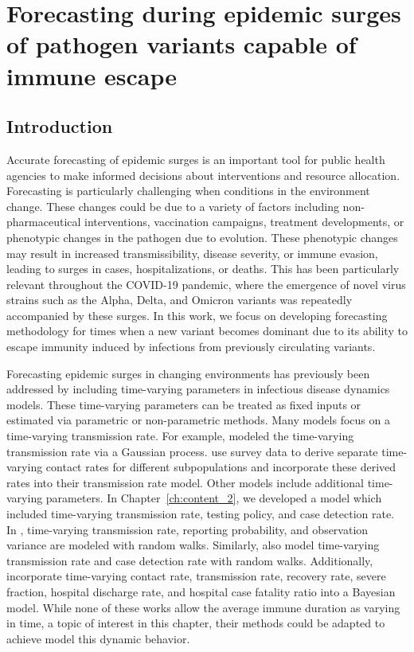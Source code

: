 \chapter{Forecasting during epidemic surges of pathogen variants capable of immune escape}
\graphicspath{{figures/ch_5/}}
\label{ch:content_3}

\section{Introduction}
\label{ch_5:sec:intro}

Accurate forecasting of epidemic surges is an important tool for public health agencies to make informed decisions about interventions and resource allocation.
Forecasting is particularly challenging when conditions in the environment change.
These changes could be due to a variety of factors including non-pharmaceutical interventions, vaccination campaigns, treatment developments, or phenotypic changes in the pathogen due to evolution.
These phenotypic changes may result in increased transmissibility, disease severity, or immune evasion, leading to surges in cases, hospitalizations, or deaths.
This has been particularly relevant throughout the COVID-19 pandemic, where the emergence of novel virus strains such as the Alpha, Delta, and Omicron variants was repeatedly accompanied by these surges.
In this work, we focus on developing forecasting methodology for times when a new variant becomes dominant due to its ability to escape immunity induced by infections from previously circulating variants.

Forecasting epidemic surges in changing environments has previously been addressed by including time-varying parameters in infectious disease dynamics models.
These time-varying parameters can be treated as fixed inputs or estimated via parametric or non-parametric methods.
Many models focus on a time-varying transmission rate.
For example, \citet{Zhou2020Semiparametric} modeled the time-varying transmission rate via a Gaussian process.
\citet{Iyaniwura2022Mathematical} use survey data to derive separate time-varying contact rates for different subpopulations and incorporate these derived rates into their transmission rate model.
Other models include additional time-varying parameters.
In Chapter~\ref{ch:content_2}, we developed a model which included time-varying transmission rate, testing policy, and case detection rate.
In \citep{ODea2021semi}, time-varying transmission rate, reporting probability, and observation variance are modeled with random walks.
Similarly, \citet{Gibson2020real} also model time-varying transmission rate and case detection rate with random walks.
Additionally, \citet{morozova2021one} incorporate time-varying contact rate, transmission rate, recovery rate, severe fraction, hospital discharge rate, and hospital case fatality ratio into a Bayesian model.
While none of these works allow the average immune duration as varying in time, a topic of interest in this chapter, their methods could be adapted to achieve model this dynamic behavior.

